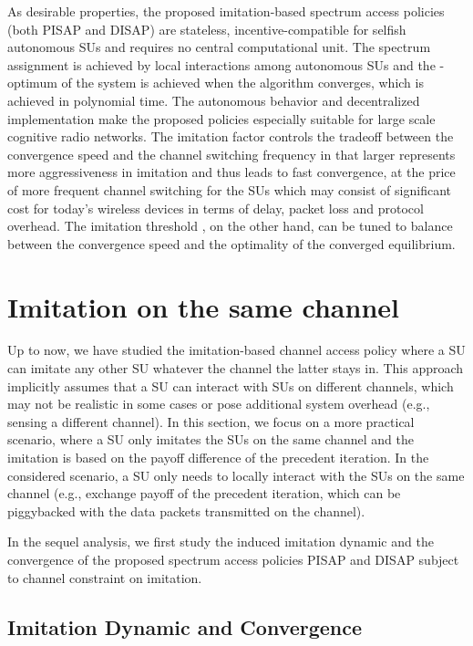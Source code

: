 \documentclass[12pt, onecolumn]{IEEEtran}
\theoremstyle{plain}
\theoremstyle{definition}
\begin{document}
As desirable properties, the proposed imitation-based spectrum access policies (both PISAP and DISAP) are stateless, incentive-compatible for selfish autonomous SUs and requires no central computational unit. The spectrum assignment is achieved by local interactions among autonomous SUs and the -optimum of the system is achieved when the algorithm converges, which is achieved in polynomial time. The autonomous behavior and decentralized implementation make the proposed policies especially suitable for large scale cognitive radio networks. The imitation factor  controls the tradeoff between the convergence speed and the channel switching frequency in that larger  represents more aggressiveness in imitation and thus leads to fast convergence, at the price of more frequent channel switching for the SUs which may consist of significant cost for today's wireless devices in terms of delay, packet loss and protocol overhead. The imitation threshold , on the other hand, can be tuned to balance between the convergence speed and the optimality of the converged equilibrium. 

\section{Imitation on the same channel}
\label{sec:NewScenario}





Up to now, we have studied the imitation-based channel access policy where a SU can imitate any other SU whatever the channel the latter stays in. This approach implicitly assumes that a  SU can interact with SUs on different channels, which may not be realistic in some cases or pose additional system overhead (e.g., sensing a different channel). In this section, we focus on a more practical scenario, where a SU only imitates the SUs on the same channel and the imitation is based on the payoff difference of the precedent iteration. In the considered scenario, a SU only needs to locally interact with the SUs on the same channel (e.g., exchange payoff of the precedent iteration, which can be piggybacked with the data packets transmitted on the channel).




In the sequel analysis, we first study the induced imitation dynamic and the convergence of the proposed spectrum access policies PISAP and DISAP subject to channel constraint on imitation.

\subsection{Imitation Dynamic and Convergence}
\label{subsec:dynamicsScenario2}
\end{document}
